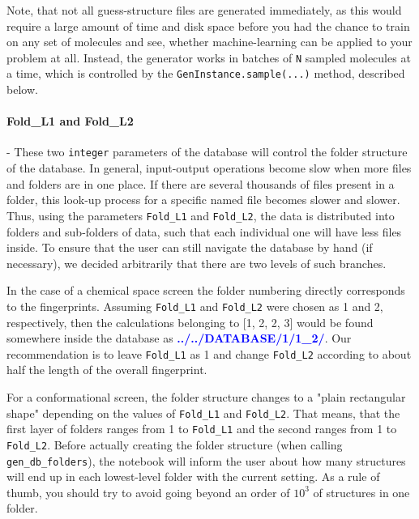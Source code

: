 \documentclass[12pt]{achemso}
\newcommand{\bl}[1]{\textcolor{blue}{\textbf{#1}}}
\begin{document}
\noindent Note, that not all guess-structure files are generated immediately, as this would require a large amount of time and disk space before you had the chance to train on any set of molecules and see, whether machine-learning can be applied to your problem at all. Instead, the generator works in batches of \texttt{N} sampled molecules at a time, which is controlled by the \texttt{GenInstance.sample(...)} method, described below.

\paragraph{Fold\_L1 and Fold\_L2} - These two \texttt{integer} parameters of the database will control the folder structure of the database. In general, input-output operations become slow when more files and folders are in one place. If there are several thousands of files present in a folder, this look-up process for a specific named file becomes slower and slower. Thus, using the parameters \texttt{Fold\_L1} and \texttt{Fold\_L2}, the data is distributed into folders and sub-folders of data, such that each individual one will have less files inside. To ensure that the user can still navigate the database by hand (if necessary), we decided arbitrarily that there are two levels of such branches.

\noindent In the case of a chemical space screen the folder numbering directly corresponds to the fingerprints. Assuming \texttt{Fold\_L1} and \texttt{Fold\_L2} were chosen as 1 and 2, respectively, then the calculations belonging to [1, 2, 2, 3] would be found somewhere inside the database as \bl{../../DATABASE/1/1\_2/}. Our recommendation is to leave \texttt{Fold\_L1} as 1 and change \texttt{Fold\_L2} according to about half the length of the overall fingerprint.

\noindent For a conformational screen, the folder structure changes to a "plain rectangular shape" depending on the values of \texttt{Fold\_L1} and \texttt{Fold\_L2}. That means, that the first layer of folders ranges from 1 to \texttt{Fold\_L1} and the second ranges from 1 to \texttt{Fold\_L2}. Before actually creating the folder structure (when calling \texttt{gen\_db\_folders}), the notebook will inform the user about how many structures will end up in each lowest-level folder with the current setting. As a rule of thumb, you should try to avoid going beyond an order of $10^3$ of structures in one folder.
\end{document}

